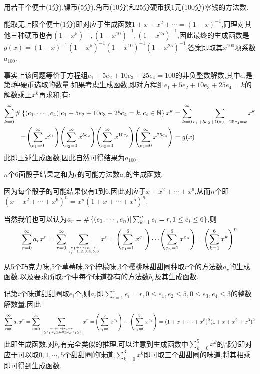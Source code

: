 \documentclass[11pt]{article}
\begin{document}
\begin{example}
    用若干个便士(1分),镍币(5分),角币(10分)和25分硬币换1元(100分)零钱的方法数.
\end{example}
能取无上限个便士(1分)即对应于生成函数$1+x+x^2+\cdots=(1-x)^{-1}$,同理对其他三种硬币也有$(1-x^5)^{-1},(1-x^{10})^{-1},(1-x^{25})^{-1}$,因此最终的生成函数是$g(x)=(1-x)^{-1}(1-x^5)^{-1}(1-x^{10})^{-1}(1-x^{25})^{-1}$,答案即取其$x^{100}$项系数$a_{100}$.

事实上该问题等价于方程组$e_1+5e_2+10e_3+25e_4=100$的非负整数解数,其中$e_i$是第$i$种硬币选取的数量.如果考虑生成函数,即对方程组$e_1+5e_2+10e_3+25e_4=k$的解数乘上$x^k$再求和,有:
$$\begin{aligned}
    \sum_{k=0}^\infty \#\left\{(e_1,\cdots,e_4)|e_1+5e_2+10e_3+25e_4=k,e_i\in\mathbb{N}\right\} x^k&=\sum_{k=0}^\infty \sum_{e_1+5e_2+10e_3+25e_4=k} x^k\\
    =\!\left(\sum_{e_1=0}^\infty x^{e_1}\right)\!\left(\sum_{e_2=0}^\infty x^{5e_2}\right)\!\left(\sum_{e_3=0}^\infty x^{10e_3}\right)\!\left(\sum_{e_4=0}^\infty x^{25e_4}\right)&=g(x)
\end{aligned}$$
此即上述生成函数,因此自然可得结果为$a_{100}$.

\begin{example}
    $n$个6面骰子结果之和为$r$的可能方法数$a_r$的生成函数.
\end{example}
因为每个骰子的可能结果仅有1到6,因此对应于$x+x^2+\cdots+x^6$,从而$n$个即$(x+x^2+\cdots+x^6)^n=x^n(1+x+\cdots+x^5)^n$.

当然我们也可以认为$a_r=\#\left\{(e_1,\cdots,e_n)|\sum_{k=1}^n e_i=r, 1\leq e_i\leq 6\right\}$,则
$$\sum_{r=0}^{\infty} a_rx^r=\sum_{r=0}^{\infty}\sum_{e_1+\cdots e_n=r\atop e_i=1,2,3,4,5,6}x^r=\!\left(\sum_{e_1=1}^{6}x^{e_1}\right)\cdots\!\left(\sum_{e_n=1}^{6}x^{e_n}\right)=\!\left(\sum_{k=1}^{6}x^k\right)^n$$

\begin{example}
    从5个巧克力味,5个草莓味,3个柠檬味,3个樱桃味甜甜圈种取$r$个的方法数$a_r$的生成函数.以及要求所取$r$个中每个味道都有的方法数$b_r$及其生成函数.
\end{example}
记第$i$个味道甜甜圈取$e_i$个,则$a_r$即$\sum_{i=1}^4 e_i=r, 0\leq e_1,e_2\leq 5, 0\leq e_3,e_4\leq 3$的整数解数量.因此
$$\sum_{r=0}^{\infty}a_rx^r=\sum_{r=0}^{\infty}\sum_{e_1+\cdots+e_4=r\atop 0\leq e_1,e_2\leq 5, 0\leq e_3,e_4\leq 3}x^r=\!\left(\sum_{e_1=0}^5 x^{e_1}\right)\cdots\!\left(\sum_{e_4=0}^3 x^{e_4}\right)=(1+x+\cdots+x^5)^2(1+x+x^2+x^3)^2$$
此即生成函数.对$b_r$有完全类似的推理.可以注意到生成函数中$\sum_{k=0}^5 x^k$的部分即对应于可以取$0,1,\cdots,5$个甜甜圈的味道,$\sum_{k=0}^3 x^k$即可取三个甜甜圈的味道,将其相乘即可得到生成函数.
\end{document}
